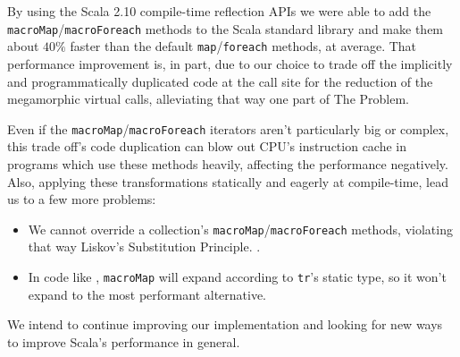 \label{conclusions}

By using the Scala 2.10 compile-time reflection APIs we were able to add the \texttt{macroMap}/\texttt{macroForeach} methods to the Scala standard library and make them about $40\%$ faster than the default \texttt{map}/\texttt{foreach} methods, at average. That performance improvement is, in part, due to our choice to trade off the implicitly and programmatically duplicated code at the call site for the reduction of the megamorphic virtual calls, alleviating that way one part of The Problem.

Even if the \texttt{macroMap}/\texttt{macroForeach} iterators aren't particularly big or complex, this trade off's code duplication can blow out CPU's instruction cache in programs which use these methods heavily, affecting the performance negatively. Also, applying these transformations statically and eagerly at compile-time, lead us to a few more problems:

\begin{itemize}
 \item We cannot override a collection's \texttt{macroMap}/\texttt{macroForeach} methods, violating that way Liskov's Substitution Principle. .
 \item In code like , \texttt{macroMap} will expand according to \texttt{tr}'s static type, so it won't expand to the most performant alternative.
\end{itemize}

We intend to continue improving our implementation and looking for new ways to improve Scala's performance in general.
